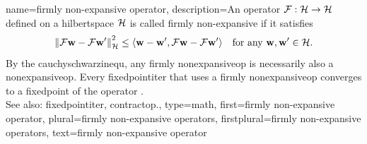{name={firmly non-expansive operator},
 	description={An \gls{operator} 
		$\mathcal{F}: \mathcal{H} \rightarrow \mathcal{H}$ defined on a 
		\gls{hilbertspace} $\mathcal{H}$ is called firmly non-expansive if it satisfies
 		\begin{equation} 
 			\nonumber
 			\normgeneric{ \fixedpointop \weights - \fixedpointop \weights'}{\hilbertspace}^2  
			\leq 	\innerprod{ \weights - \weights'}{ \fixedpointop \weights - \fixedpointop \weights'} 
			\quad \mbox{for any } \weights, \weights' \in \hilbertspace. 
 		\end{equation}
		By the \gls{cauchyschwarzinequ}, any firmly \gls{nonexpansiveop} is necessarily 
		also a \gls{nonexpansiveop}. 
		Every \gls{fixedpointiter} that uses a firmly \gls{nonexpansiveop} converges 
		to a \gls{fixedpoint} of the \gls{operator} \cite{BausckeCombette}.
		\\ 
 		See also: \gls{fixedpointiter}, \gls{contractop}.},
 	type=math, 
	first={firmly non-expansive operator},
 	plural={firmly non-expansive operators},
	firstplural={firmly non-expansive operators},
 	text={firmly non-expansive operator}
}


